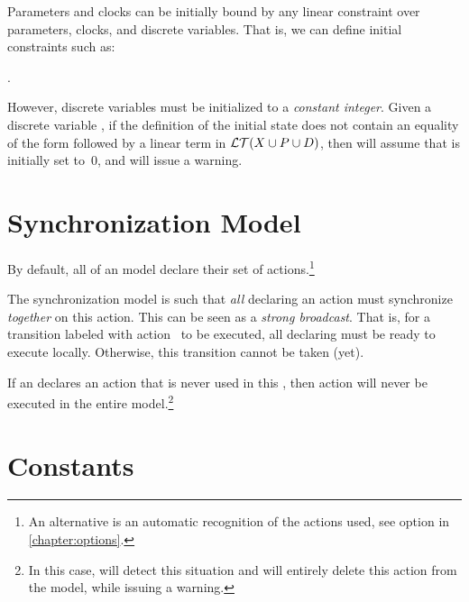 Parameters and clocks can be initially bound by any linear constraint over parameters, clocks, and discrete variables.
That is, we can define initial constraints such as:
\begin{center}
	.
\end{center}

However, discrete variables must be initialized to a \emph{constant integer}.
Given a discrete variable , if the definition of the initial state does not contain an equality of the form  followed by a linear term in $\mathcal{LT}(X \cup P \cup D)$, then \imitator{} will assume that  is initially set to~0, and will issue a warning.



\section{Synchronization Model}\label{sect:synchronization}

By default, all \IPTA{} of an \imitator{} model declare their set of actions.\footnote{%
	An alternative is an automatic recognition of the actions used, see option  in \cref{chapter:options}.
}

The \imitator{} synchronization model is such that \emph{all} \IPTA{} declaring an action must synchronize \emph{together} on this action.
This can be seen as a \emph{strong broadcast}.
That is, for a transition labeled with action~ to be executed, all \IPTA{} declaring  must be ready to execute  locally.
Otherwise, this transition cannot be taken (yet).

If an \IPTA{} declares an action  that is never used in this \IPTA{}, then action  will never be executed in the entire model.\footnote{%
	In this case, \imitator{} will detect this situation and will entirely delete this action from the model, while issuing a warning.
}

\section{Constants}

